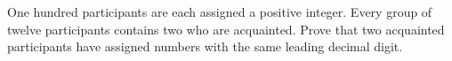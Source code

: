 One hundred participants are each assigned a positive integer. Every group of twelve participants contains two who are acquainted. Prove that two acquainted participants have assigned numbers with the same leading decimal digit.
